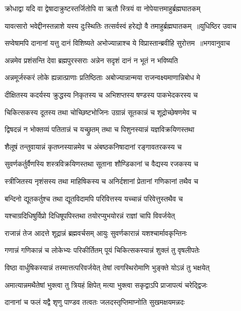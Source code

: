 \twolineshloka
{क्रोधाद्वा यदि वा द्वेषादाक्रुष्टस्तर्जितोपि वा}
{ऋतौ स्त्रियं वा नोपेयात्तमाहुर्ब्रह्मघातकम्}


\threelineshloka
{यावत्सारो भवेद्दीनस्तन्नाशे यस्य दुःस्थितिः}
{तत्सर्वस्वं हरेद्यो वै तमाहुर्ब्रह्मघातकम् ॥युधिष्ठिर उवाच}
{}


\threelineshloka
{सप्वेषामपि दानानां यत्तु दानं विशिष्यते}
{अभोज्यान्नाश्च ये विप्रास्तान्ब्रवीहि सुरोत्तम ॥भगवानुवाच}
{}


\twolineshloka
{अन्नमेव प्रशंसन्ति देवा ब्रह्मपुरस्सराः}
{अन्नेन सदृशं दानं न भूतं न भविष्यति}


\twolineshloka
{अन्नमूर्जस्करं लोके ह्यन्नात्प्राणाः प्रतिष्ठिताः}
{अबोज्यान्नान्मया राजन्वक्ष्यमाणान्निबोध मे}


\twolineshloka
{दीक्षितस्य कदर्यस्य क्रुद्धस्य निकृतस्य च}
{अभिशप्तस्य षण्डस्य पाकभेदकरस्य च}


\twolineshloka
{चिकित्सकस्य दूतस्य तथा चोच्छिष्टभोजिनः}
{उग्रान्नं सूतकान्नं च शूद्रोच्छेषणमेव च}


\twolineshloka
{द्विषदन्नं न भोक्तव्यं पतितान्नं च यच्छ्रुतम्}
{तथा च पिशुनस्यान्नं यज्ञविक्रयिणस्तथा}


\twolineshloka
{शैलूषं तन्तुवायान्नं कृतघ्नस्यान्नमेव च}
{अंबष्ठकनिषादानां रङ्गावतरकस्य च}


\twolineshloka
{सुवर्णकर्तुर्वैणस्यि शस्त्रविक्रयिणस्तथा}
{सूताना शौण्डिकानां च वैद्यस्य रजकस्य च}


\twolineshloka
{स्त्रीजितस्य नृशंसस्य तथा माहिषिकस्य च}
{अनिर्दशानां प्रेतानां गणिकानां तथैव च}


\twolineshloka
{बन्दिनो द्यूतकर्तुश्च तथा द्यूतविदामपि}
{परिवित्तस्य यच्चान्नं परिवेत्तुस्तथैव च}


\twolineshloka
{यश्चाग्रदिधिषुर्विप्रो दिधिषूपपिस्तथा}
{तयोरप्युभयोरन्नं राज्ञां चापि विवर्जयेत्}


\twolineshloka
{राजान्नं तेज आदत्ते शूद्रान्नं ब्रह्मवर्चसम्}
{आयुः सुवर्णकारान्नं यशश्चार्मावकृन्तिनः}


\twolineshloka
{गणान्नं गणिकान्नं च लोकेभ्यः परिकीर्तितम्}
{पूयं चिकित्सकस्यान्नं शुक्लं तु वृषलीपतेः}


\twolineshloka
{विष्ठा वार्धुषिकस्यान्नं तस्मात्तत्परिवर्जयेत्}
{तेषां त्वगस्थिरोमाणि भुङ्क्ते योऽन्नं तु भक्षयेत्}


\twolineshloka
{अमात्यान्नमथैतेषां भुक्त्वा तु त्रियहं क्षिपेत्}
{मत्या भुक्त्वा सकृद्वाऽपि प्राजापत्यं चरेद्द्विजः}


\twolineshloka
{दानानां च फलं यद्वै शृणु पाण्डव तत्वतः}
{जलदस्तृप्तिमाप्नोति सुखमक्षयमन्नदः}


